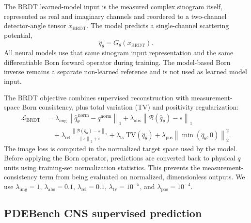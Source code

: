 \documentclass[11pt]{article}
\begin{document}
The BRDT learned-model input is the measured complex sinogram itself,
represented as real and imaginary channels and reordered to a two-channel
detector-angle tensor $x_{\mathrm{BRDT}}$. The model predicts a single-channel
scattering potential,
\begin{equation}
  \hat{q}_{\theta} = G_{\theta}(x_{\mathrm{BRDT}}).
\end{equation}
All neural models use that same sinogram input representation and the same
differentiable Born forward operator during training. The model-based Born
inverse remains a separate non-learned reference and is not used as learned
model input.

The BRDT objective combines supervised reconstruction with measurement-space
Born consistency, plus total variation (TV) \cite{tvregularization} and
positivity regularization:
\begin{align}
  \mathcal{L}_{\mathrm{BRDT}}
  &=
  \lambda_{\mathrm{img}}
  \left\|\hat{q}_{\theta}^{\,\mathrm{norm}} - q^{\mathrm{norm}}\right\|_1
  +
  \lambda_{\mathrm{abs}}
  \left\|\mathcal{B}(\hat{q}_{\theta}) - s\right\|_1 \nonumber \\
  &\quad+
  \lambda_{\mathrm{rel}}
  \frac{
    \left\|\mathcal{B}(\hat{q}_{\theta}) - s\right\|_2
  }{
    \left\|s\right\|_2 + \epsilon
  }
  +
  \lambda_{\mathrm{tv}}\,\mathrm{TV}(\hat{q}_{\theta})
  +
  \lambda_{\mathrm{pos}}
  \left\|\min(\hat{q}_{\theta},0)\right\|_2^2 .
\end{align}
The image loss is computed in the normalized target space used by the model.
Before applying the Born operator, predictions are converted back to physical
$q$ units using training-set normalization statistics. This prevents the
measurement-consistency term from being evaluated on normalized, dimensionless
outputs. We use $\lambda_{\mathrm{img}}=1$,
$\lambda_{\mathrm{abs}}=0.1$, $\lambda_{\mathrm{rel}}=0.1$,
$\lambda_{\mathrm{tv}}=10^{-5}$, and
$\lambda_{\mathrm{pos}}=10^{-4}$.

\subsection{PDEBench CNS supervised prediction}
\end{document}
